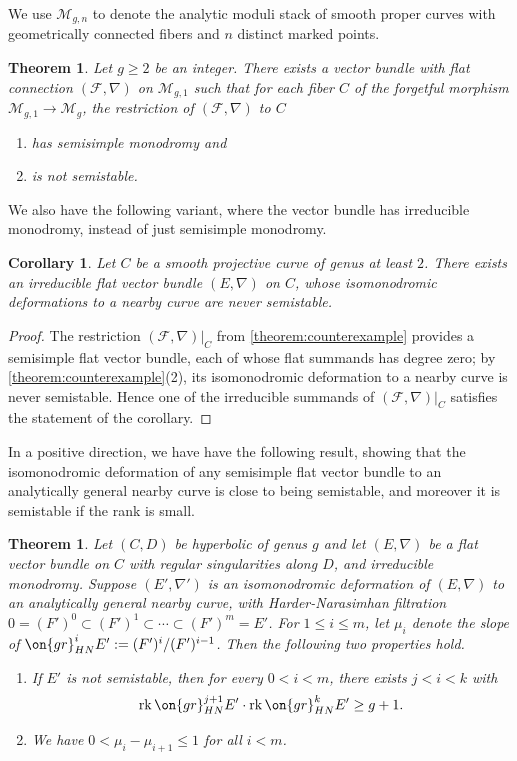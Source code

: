 \documentclass[12 pt]{amsart}
\theoremstyle{plain}
\newtheorem{theorem}[subsubsection]{Theorem}
\newtheorem{corollary}[subsubsection]{Corollary}
\theoremstyle{definition}
\theoremstyle{remark}
\numberwithin{equation}{section}
\DeclareMathOperator\rk{rk}
\begin{document}
We use 
$\mathscr{M}_{g,n}$ to denote the analytic moduli stack of smooth proper curves with
geometrically connected fibers and $n$ distinct marked points.
\begin{theorem}
	\label{theorem:counterexample}
Let $g\geq 2$ be an integer. There exists a vector bundle with flat connection
$(\mathscr{F}, \nabla)$ on $\mathscr{M}_{g,1}$ such that for each fiber $C$ of
the forgetful morphism $\mathscr{M}_{g,1} \to \mathscr{M}_g$, the restriction of $(\mathscr{F}, \nabla)$ to $C$
\begin{enumerate}
    \item has semisimple monodromy and
    \item is not semistable.
\end{enumerate}
\end{theorem}
%

We also have the following variant, where the vector bundle has irreducible
monodromy, instead of just semisimple monodromy.
\begin{corollary}\label{corollary:counterexample}
Let $C$ be a smooth projective curve of genus at least $2$. There exists an irreducible flat
vector bundle $(E, \nabla)$ on $C$, whose isomonodromic deformations to
a nearby curve are never semistable.
\end{corollary}
\begin{proof}
	The restriction $(\mathscr{F}, \nabla)|_C$ from \autoref{theorem:counterexample} provides a semisimple flat vector bundle, each of whose flat summands has degree zero; by \autoref{theorem:counterexample}(2), its
isomonodromic deformation to a nearby curve is never semistable. Hence one of
the irreducible summands of
$(\mathscr{F}, \nabla)|_C$
satisfies the statement of the corollary.
\end{proof}

In a positive direction, we have have the following result, showing 
that the 
isomonodromic deformation of any semisimple flat vector bundle to an
analytically general nearby curve is close to being semistable, and moreover it is
semistable if the rank is small.

\begin{theorem}
	\label{theorem:hn-constraints}
	Let $(C,D)$ be hyperbolic of genus $g$ and let
	$({E}, \nabla)$ be a flat
	vector bundle on $C$ with regular singularities along $D$,
	and irreducible
monodromy.
Suppose
 $(E',\nabla')$ 
is an isomonodromic deformation
of $({E}, \nabla)$ to an analytically general nearby curve,
with Harder-Narasimhan filtration $0 = (F')^0 \subset (F')^1 \subset \cdots \subset
(F')^m =
E'$. For $1 \leq i \leq m$, let $\mu_i$ denote the slope of
$\on{gr}^{i}_{HN}E' := (F')^i/(F')^{i-1}$.
Then the following two properties hold.
\begin{enumerate}
	\item If $E'$ is not semistable, then for every $0 < i < m$, there
	exists $j < i < k$ with $$\rk \on{gr}^{j+1}_{HN}E'\cdot \rk
	\on{gr}^k_{HN}E'\geq g+1.$$
\item We have $0<\mu_i-\mu_{i+1}\leq 1$ for all $i<m$.
\end{enumerate}
\end{theorem}
\end{document}
